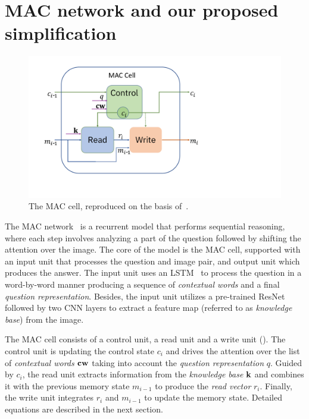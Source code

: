 \section{MAC network and our proposed simplification}

\begin{figure}
	\vspace{-15pt}
	\centering
	\includegraphics[width=\textwidth]{../img/mac_cell.pdf}
	\caption{The MAC cell, reproduced on the basis of~\cite{hudson2018compositional}.}
	\label{fig:mac_cell}
	\vspace{-5pt}
\end{figure}

The MAC network~\cite{hudson2018compositional} is a recurrent model that performs sequential reasoning, where each step involves analyzing a part of the question followed by shifting the attention over the image.
The core of the model is the MAC cell, supported with an input unit that processes the question and image pair, and output unit which produces the answer.
The input unit  uses an LSTM~\cite{hochreiter1997long} to process the question in a word-by-word manner producing a sequence of \emph{contextual words} and a final \emph{question representation}.
Besides, the input unit utilizes a pre-trained ResNet~\cite{he2016resnet} followed by two CNN layers to extract a feature map (referred to as \emph{knowledge base}) from the image.

	
The MAC cell consists of a control unit, a read unit and a write unit ().
The control unit is updating the control state $c_i$ and drives the attention over the list of \emph{contextual words} $\mathbf{cw}$ taking into account the \emph{question representation} $q$.
Guided by $c_i$,  the read unit extracts information from the \emph{knowledge base} $\mathbf{k}$ and combines it with the previous memory state $m_{i-1}$  to produce the \emph{read vector} $r_i$.
Finally, the write unit integrates $r_i$ and $m_{i-1}$ to update the memory state. Detailed equations are described in the next section.

